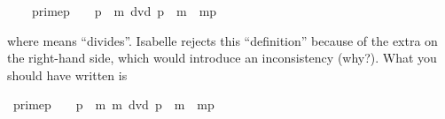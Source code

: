 \begin{isabelle}%
\isanewline
\ \ \ \ {\isachardoublequote}prime{\isacharparenleft}p{\isacharparenright}\ {\isasymequiv}\ \ {\isacharless}\ p\ {\isasymand}\ {\isacharparenleft}m\ dvd\ p\ {\isasymlongrightarrow}\ {\isacharparenleft}m{\isacharequal}\ {\isasymor}\ m{\isacharequal}p{\isacharparenright}{\isacharparenright}{\isachardoublequote}%
\begin{isamarkuptext}%
\noindent\small
where  means ``divides''.
Isabelle rejects this ``definition'' because of the extra  on the
right-hand side, which would introduce an inconsistency (why?). What you
should have written is%
\end{isamarkuptext}%
\ {\isachardoublequote}prime{\isacharparenleft}p{\isacharparenright}\ {\isasymequiv}\ \ {\isacharless}\ p\ {\isasymand}\ {\isacharparenleft}{\isasymforall}m{\isachardot}\ m\ dvd\ p\ {\isasymlongrightarrow}\ {\isacharparenleft}m{\isacharequal}\ {\isasymor}\ m{\isacharequal}p{\isacharparenright}{\isacharparenright}{\isachardoublequote}\end{isabelle}%
